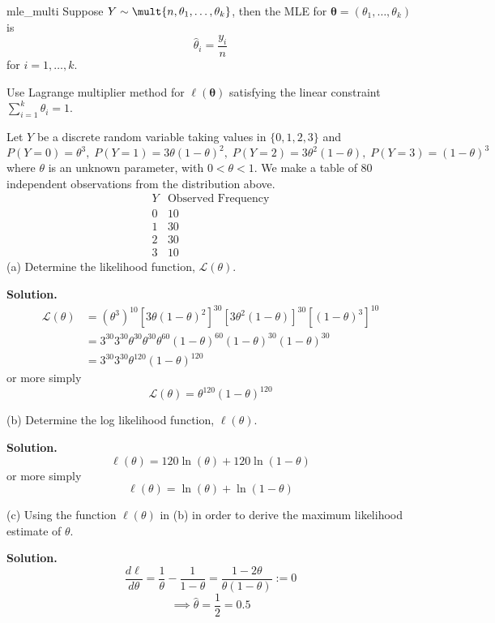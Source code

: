 \begin{Proposition}{}{mle_multi}
    Suppose $ Y \sim \mult{n,\theta_1,\ldots ,\theta_k} $, then the MLE for
    $ \symbf{\theta}=(\theta_1,\ldots ,\theta_k) $ is
    \[ \hat{\theta}_i=\frac{y_i}{n} \]
    for $ i=1,\ldots ,k $.
\end{Proposition}

\begin{Proof}{}{}
    Use Lagrange multiplier method for $ \ell(\symbf{\theta}) $ satisfying the linear
    constraint $ \sum\limits_{i=1}^{k} \theta_i=1 $.
\end{Proof}


\begin{Example}{}{}
    Let $ Y $ be a discrete random variable taking values in $ \{0,1,2,3\} $ and
    \[ P(Y=0)=\theta^3,\; P(Y=1)=3\theta(1-\theta)^2,\;P(Y=2)=3\theta^2(1-\theta),\;
        P(Y=3)=(1-\theta)^3 \]
    where $ \theta $ is an unknown parameter, with $ 0<\theta<1 $.
    We make a table of $ 80 $ independent observations from the distribution above.
    \[
        \begin{array}{c|c}
            Y & \text{Observed Frequency} \\
            \hline
            0 & 10                        \\
            1 & 30                        \\
            2 & 30                        \\
            3 & 10
        \end{array}
    \]
    (a) Determine the likelihood function, $ \mathcal{L}(\theta) $.

    \textbf{Solution.}
    \begin{align*}
        \mathcal{L}(\theta)
         & =\left( \theta^3 \right)^{10}\left[ 3\theta(1-\theta)^2 \right]^{30}
        \left[ 3\theta^2(1-\theta) \right]^{30}\left[ (1-\theta)^3 \right]^{10}                        \\
         & =3^{30}3^{30}\theta^{30}\theta^{30}\theta^{60}(1-\theta)^{60}(1-\theta)^{30}(1-\theta)^{30} \\
         & =3^{30}3^{30}\theta^{120}(1-\theta)^{120}
    \end{align*}
    or more simply
    \[ \mathcal{L}(\theta)=\theta^{120}(1-\theta)^{120} \]

    (b) Determine the log likelihood function, $ \ell(\theta) $.

    \textbf{Solution.}
    \[ \ell(\theta)=120\ln(\theta)+120\ln(1-\theta) \]
    or more simply
    \[ \ell(\theta)=\ln(\theta)+\ln(1-\theta) \]

    (c) Using the function $ \ell(\theta) $ in (b) in order to derive the maximum
    likelihood estimate of $ \theta $.

    \textbf{Solution.}
    \[ \frac{d\ell}{d\theta}=\frac{1}{\theta}-\frac{1}{1-\theta}=\frac{1-2\theta}{\theta(1-\theta)}:=0 \]
    \[ \implies \hat{\theta}=\frac{1}{2}=0.5 \]
\end{Example}



